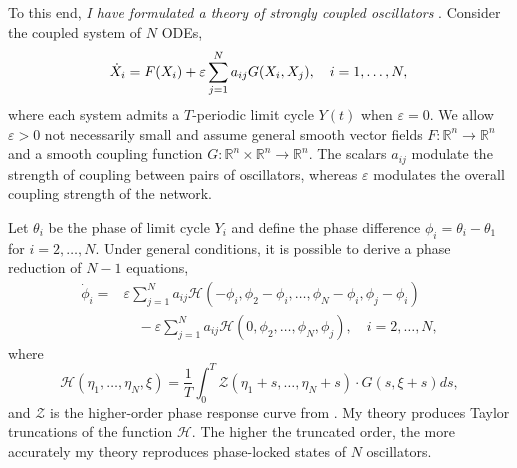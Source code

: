 \documentclass[a4paper,11pt]{article}
\newcommand{\ve}{\varepsilon}
\newcommand{\h}{\mathcal{H}}
\begin{document}
To this end, \textit{I have formulated a theory of strongly coupled oscillators} \cite{park2020high}. Consider the coupled system of $N$ ODEs,
\begin{equation}\label{eq:odes}
\dot X_i = F(X_i) +\ve \sum_{j=1}^N a_{ij} G(X_i,X_j), \quad i=1,\ldots,N,\\
\end{equation}
where each system admits a $T$-periodic limit cycle $Y(t)$ when $\ve=0$. We allow $\ve>0$ not necessarily small and assume general smooth vector fields $F:\mathbb{R}^n \rightarrow \mathbb{R}^n$ and a smooth coupling function $G:\mathbb{R}^n\times\mathbb{R}^n\rightarrow \mathbb{R}^n$. The scalars $a_{ij}$ modulate the strength of coupling between pairs of oscillators, whereas $\ve$ modulates the overall coupling strength of the network.

Let $\theta_i$ be the phase of limit cycle $Y_i$ and define the phase difference $\phi_i=\theta_i-\theta_1$ for $i=2,\ldots,N$. Under general conditions, it is possible to derive a phase reduction of $N-1$ equations,
\begin{align*}
\dot \phi_i =& \ve\sum_{j=1}^N a_{ij} \h(-\phi_i,\phi_2-\phi_i,\ldots,\phi_N-\phi_i,\phi_j-\phi_i)\\
&\quad- \ve\sum_{j=1}^N a_{ij} \h(0,\phi_2,\ldots,\phi_N,\phi_j), \quad i=2,\ldots,N,
\end{align*}
where
\begin{equation*}
\h(\eta_1,\ldots,\eta_N,\xi) = \frac{1}{T} \int_0^T \mathcal{Z}(\eta_1+s,\ldots,\eta_N+s) \cdot G(s,\xi+s)ds,
\end{equation*}
and $\mathcal{Z}$ is the higher-order phase response curve from \cite{wilson2020phase}. My theory produces Taylor truncations of the function $\h$. The higher the truncated order, the more accurately my theory reproduces phase-locked states of $N$ oscillators.
\end{document}
